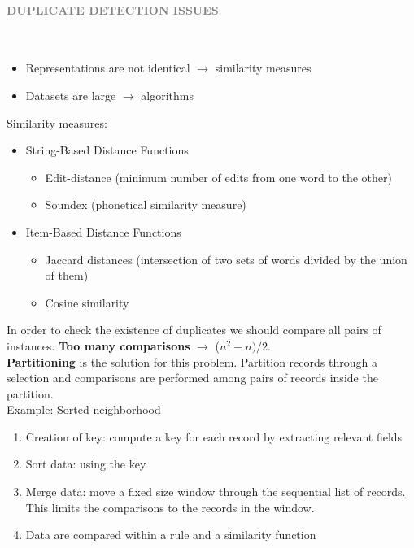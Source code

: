 \documentclass[10pt,a4paper]{article}
\newcommand{\myparagraph}[1]{\paragraph{\normalsize{\textcolor{gray}{\uppercase{\textbf{#1}}}} }\mbox{} \vspace{0.5em}\\}
\begin{document}
\myparagraph{Duplicate Detection Issues}
\begin{itemize}
	\item Representations are not identical $\rightarrow$ similarity measures
	\item Datasets are large $\rightarrow$ algorithms
\end{itemize}
Similarity measures:
\begin{itemize}
	\item String-Based Distance Functions
	\begin{itemize}
		\item Edit-distance (minimum number of edits from one word to the other)
		\item Soundex (phonetical similarity measure)
	\end{itemize}
	\item Item-Based Distance Functions
	\begin{itemize}
		\item Jaccard distances (intersection of two sets of words divided by the union of them)
		\item Cosine similarity
	\end{itemize}
\end{itemize}
In order to check the existence of duplicates we should compare all pairs of instances. \textbf{Too many comparisons} $\rightarrow$ ($n^2-n)/2$. \\
\textbf{Partitioning} is the solution for this problem. Partition records through a selection and comparisons are performed among pairs of records inside the partition. \\ 
Example: \uline{Sorted neighborhood}
\begin{enumerate}
	\item Creation of key: compute a key for each record by extracting relevant fields
	\item Sort data: using the key 
	\item Merge data: move a fixed size window through the sequential list of records. This limits the comparisons to the records in the window. 
	\item Data are compared within a rule and a similarity function
\end{enumerate}
\end{document}

